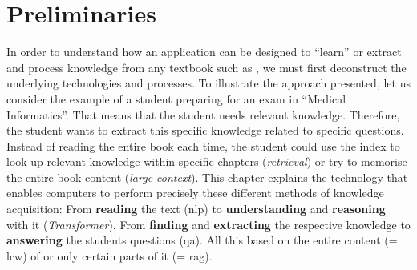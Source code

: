\chapter{Preliminaries}\label{ch:preliminaries}

In order to understand how an application can be designed to \enquote{learn} or extract and process knowledge from any textbook such as \citet{bb2}, we must first deconstruct the underlying technologies and processes.
To illustrate the approach presented, let us consider the example of a student preparing for an exam in \enquote{Medical Informatics}.
That means that the student needs relevant knowledge.
Therefore, the student wants to extract this specific knowledge related to specific questions.
Instead of reading the entire book each time, the student could use the index to look up relevant knowledge within specific chapters (\textit{retrieval}) or try to memorise the entire book content (\textit{large context}).
This chapter explains the technology that enables computers to perform precisely these different methods of knowledge acquisition: From \textbf{reading} the text (\ac{nlp}) to \textbf{understanding} and \textbf{reasoning} with it (\textit{Transformer}).
From \textbf{finding} and \textbf{extracting} the respective knowledge to \textbf{answering} the students questions (\ac{qa}).
All this based on the entire content (= \ac{lcw}) of  or only certain parts of it (= \ac{rag}).
%
